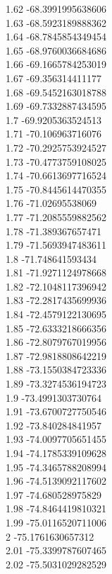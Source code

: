 {1.62	-68.3991995638606\\
1.63	-68.5923189888362\\
1.64	-68.7845854349454\\
1.65	-68.9760036684686\\
1.66	-69.1665784253019\\
1.67	-69.356314411177\\
1.68	-69.5452163018788\\
1.69	-69.7332887434595\\
1.7	-69.9205363524513\\
1.71	-70.106963716076\\
1.72	-70.2925753924527\\
1.73	-70.4773759108025\\
1.74	-70.6613697716524\\
1.75	-70.8445614470355\\
1.76	-71.02695538069\\
1.77	-71.2085559882562\\
1.78	-71.389367657471\\
1.79	-71.5693947483611\\
1.8	-71.748641593434\\
1.81	-71.9271124978668\\
1.82	-72.1048117396942\\
1.83	-72.2817435699936\\
1.84	-72.4579122130695\\
1.85	-72.6333218666356\\
1.86	-72.8079767019956\\
1.87	-72.9818808642219\\
1.88	-73.1550384723336\\
1.89	-73.3274536194723\\
1.9	-73.4991303730764\\
1.91	-73.6700727750546\\
1.92	-73.840284841957\\
1.93	-74.0097705651455\\
1.94	-74.1785339109628\\
1.95	-74.3465788208994\\
1.96	-74.5139092117602\\
1.97	-74.680528975829\\
1.98	-74.8464419810321\\
1.99	-75.0116520711006\\
2	-75.1761630657312\\
2.01	-75.3399787607465\\
2.02	-75.5031029282529\\
}
